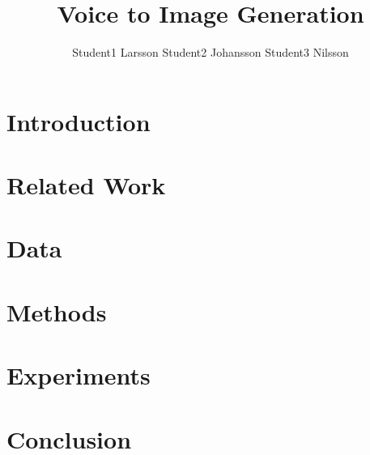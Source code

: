 \documentclass{article}
\title{Voice to Image Generation}
\author{%
  Student1 Larsson \And Student2 Johansson \And Student3 Nilsson
}
\begin{document}
\maketitle
\begin{abstract}

\end{abstract}
\section{Introduction}


\section{Related Work}


\section{Data}


\section{Methods}


\section{Experiments}


\section{Conclusion}


\printbibliography
\end{document}
